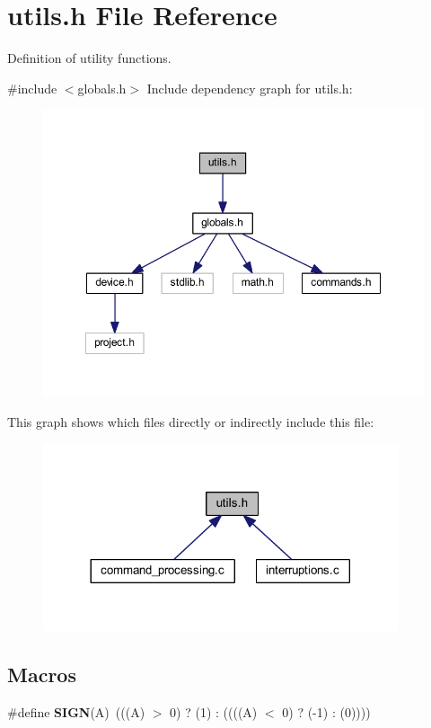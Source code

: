 \section{utils.\+h File Reference}
\label{utils_8h}


Definition of utility functions.  


{\ttfamily \#include $<$globals.\+h$>$}\newline
Include dependency graph for utils.\+h\+:\nopagebreak
\begin{figure}[H]
\begin{center}
\leavevmode
\includegraphics[width=350pt]{utils_8h__incl}
\end{center}
\end{figure}
This graph shows which files directly or indirectly include this file\+:\nopagebreak
\begin{figure}[H]
\begin{center}
\leavevmode
\includegraphics[width=296pt]{utils_8h__dep__incl}
\end{center}
\end{figure}
\subsection*{Macros}
\begin{DoxyCompactItemize}
\item 
\mbox{\label{utils_8h_a8c7db0cde6d591a5abad279ba92ef021}} 
\#define {\bfseries S\+I\+GN}(A)~(((A) $>$ 0) ? (1) \+: ((((A) $<$ 0) ? (-\/1) \+: (0))))
\end{DoxyCompactItemize}
